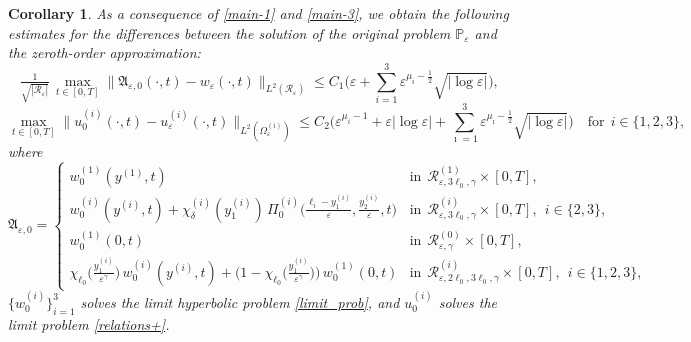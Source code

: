 \documentclass[reqno]{amsart}            %
\newtheorem{corollary}{Corollary}[section]
\numberwithin{equation}{section}
\begin{document}
	\begin{corollary}\label{corollary-4-1}
		As a consequence of \eqref{main-1} and \eqref{main-3}, we obtain the following estimates for the differences between the solution of the original problem $\mathbb{P}_\varepsilon$ and the zeroth-order approximation:  
		\begin{equation}\label{main-1+0}
			\tfrac{1}{\sqrt{|\mathcal{R}_{\varepsilon}|}}\,\max_{t\in[0,T]} \big\|\mathfrak{A}_{\varepsilon,0}(\cdot,t) - w_\varepsilon(\cdot,t)\big\|_{L^2(\mathcal{R}_\varepsilon)} \le C_1 \Big(\varepsilon +  \sum_{i=1}^{3} \varepsilon^{\mu_i - \frac12} \sqrt{|\log\varepsilon|}\Big),
		\end{equation}
		\begin{equation}\label{main-3+0}
			\max_{t\in[0,T]}\big\|u^{(i)}_0(\cdot,t) - u^{(i)}_\varepsilon(\cdot,t)\big\|_{L^2(\Omega_\varepsilon^{(i)})} 
			\le C_2 \Big(\varepsilon^{\mu_i -1} + \varepsilon |\log\varepsilon| + \sum_{\imath =1}^{3} \varepsilon^{\mu_\imath - \frac12} \sqrt{|\log\varepsilon|}
			\Big) \quad \text{for} \ \ i\in \{1,2,3\},
		\end{equation}	
		where 
		\begin{equation}\label{first_app+0}
			\mathfrak{A}_{\varepsilon,0} =
			\left\{
			\begin{array}{ll}
				w^{(1)}_0(y^{(1)}, t) & \text{in} \  \  \mathcal{R}^{(1)}_{\varepsilon,3\ell_0,\gamma}\times[0,T], 
				\\[4pt]
				w^{(i)}_0(y^{(i)}, t) + \chi_\delta^{(i)}(y^{(i)}_1) \, \Pi_0^{(i)}\!\Big(
				\tfrac{\ell_i - y^{(i)}_1}{\varepsilon},
				\tfrac{y^{(i)}_2}{\varepsilon}, t\Big)& \text{in} \ \
				\mathcal{R}^{(i)}_{\varepsilon,3\ell_0,\gamma}\times[0,T], \ \ i\in\{2, 3\},
				\\[4pt]
				w^{(1)}_0(0, t) & \text{in} \ \  \mathcal{R}^{(0)}_{\varepsilon, \gamma}\times[0,T],
				\\[4pt]
				\chi_{\ell_0}\big(\frac{y^{(i)}_1}{\varepsilon^\gamma}\big)\, w^{(i)}_0(y^{(i)}, t) +
				\Big(1- \chi_{\ell_0}\big(\frac{y^{(i)}_1}{\varepsilon^\gamma}\big)\Big)\, w^{(1)}_0(0, t) & \text{in} \ \
				\mathcal{R}^{(i)}_{\varepsilon,2\ell_0,3\ell_0,\gamma }\times[0,T], \ \ i\in\{1,2,3\},
			\end{array}
			\right.
		\end{equation}
		$\{w^{(i)}_0\}_{i=1}^3$ solves the limit hyperbolic problem \eqref{limit_prob}, and $u^{(i)}_0$ solves the limit problem \eqref{relations+}. 
	\end{corollary}	
	
\end{document}
